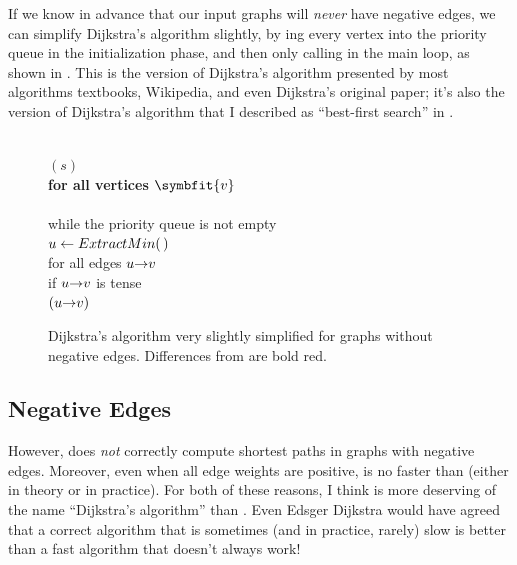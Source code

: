 If we know in advance that our input graphs will \textit{never} have negative edges, we can simplify Dijkstra’s algorithm slightly, by ing every vertex into the priority queue in the initialization phase, and then only calling  in the main loop, as shown in .
This is the version of Dijkstra’s algorithm presented by most algorithms textbooks, Wikipedia, and even Dijkstra’s original paper; it’s also the version of Dijkstra’s algorithm that I described as “best-first search” in .

\begin{figure}[ht]
\centering
\begin{pseudocode}
\\
$(s)$\\
{\color{JEred}\bfseries for all vertices $\symbfit{v}$}\\
\\
while the priority queue is not empty\\
\Indent $u \gets ExtractMin(\,)$\\
\Indent for all edges $u\mathord{\rightarrow}v$\\
\Indent\Indent if $u\mathord{\rightarrow}v$ is tense\\
\Indent\Indent\Indent {}$(u\mathord{\rightarrow}v)$\\
\Indent\Indent{}
\end{pseudocode}
\caption{Dijkstra’s algorithm very slightly simplified for graphs without negative edges. Differences from {\rmfamily{}} are bold red.}
\label{fig:8.13}
\end{figure}

\subsection{Negative Edges}

However,  does \textit{not} correctly compute shortest paths in graphs with negative edges.
Moreover, even when all edge weights are positive,  is no faster than  (either in theory or in practice).
For both of these reasons, I think  is more deserving of the name “Dijkstra’s algorithm” than .
Even Edsger Dijkstra would have agreed that a correct algorithm that is sometimes (and in practice, rarely) slow is better than a fast algorithm that doesn’t always work!

